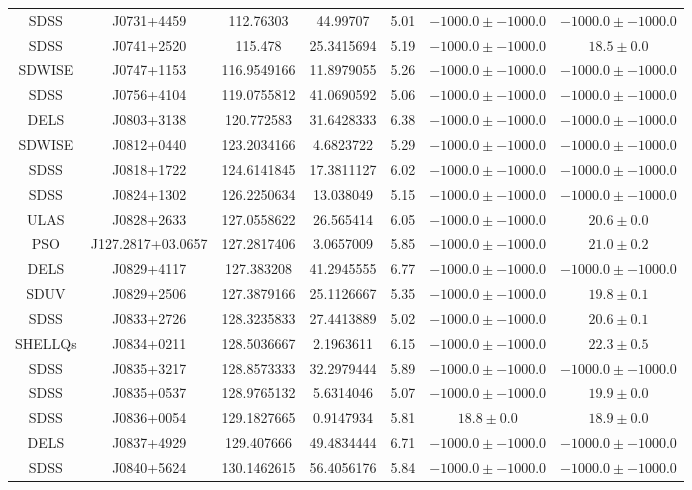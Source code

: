 \begin{table}
\begin{tabular}{ccccccc}
SDSS & J0731+4459 & 112.76303 & 44.99707 & 5.01 & $-1000.0\pm-1000.0$ & $-1000.0\pm-1000.0$ \\
SDSS & J0741+2520 & 115.478 & 25.3415694 & 5.19 & $-1000.0\pm-1000.0$ & $  18.5\pm  0.0$ \\
SDWISE & J0747+1153 & 116.9549166 & 11.8979055 & 5.26 & $-1000.0\pm-1000.0$ & $-1000.0\pm-1000.0$ \\
SDSS & J0756+4104 & 119.0755812 & 41.0690592 & 5.06 & $-1000.0\pm-1000.0$ & $-1000.0\pm-1000.0$ \\
DELS & J0803+3138 & 120.772583 & 31.6428333 & 6.38 & $-1000.0\pm-1000.0$ & $-1000.0\pm-1000.0$ \\
SDWISE & J0812+0440 & 123.2034166 & 4.6823722 & 5.29 & $-1000.0\pm-1000.0$ & $-1000.0\pm-1000.0$ \\
SDSS & J0818+1722 & 124.6141845 & 17.3811127 & 6.02 & $-1000.0\pm-1000.0$ & $-1000.0\pm-1000.0$ \\
SDSS & J0824+1302 & 126.2250634 & 13.038049 & 5.15 & $-1000.0\pm-1000.0$ & $-1000.0\pm-1000.0$ \\
ULAS & J0828+2633 & 127.0558622 & 26.565414 & 6.05 & $-1000.0\pm-1000.0$ & $  20.6\pm  0.0$ \\
PSO & J127.2817+03.0657 & 127.2817406 & 3.0657009 & 5.85 & $-1000.0\pm-1000.0$ & $  21.0\pm  0.2$ \\
DELS & J0829+4117 & 127.383208 & 41.2945555 & 6.77 & $-1000.0\pm-1000.0$ & $-1000.0\pm-1000.0$ \\
SDUV & J0829+2506 & 127.3879166 & 25.1126667 & 5.35 & $-1000.0\pm-1000.0$ & $  19.8\pm  0.1$ \\
SDSS & J0833+2726 & 128.3235833 & 27.4413889 & 5.02 & $-1000.0\pm-1000.0$ & $  20.6\pm  0.1$ \\
SHELLQs & J0834+0211 & 128.5036667 & 2.1963611 & 6.15 & $-1000.0\pm-1000.0$ & $  22.3\pm  0.5$ \\
SDSS & J0835+3217 & 128.8573333 & 32.2979444 & 5.89 & $-1000.0\pm-1000.0$ & $-1000.0\pm-1000.0$ \\
SDSS & J0835+0537 & 128.9765132 & 5.6314046 & 5.07 & $-1000.0\pm-1000.0$ & $  19.9\pm  0.0$ \\
SDSS & J0836+0054 & 129.1827665 & 0.9147934 & 5.81 & $  18.8\pm  0.0$ & $  18.9\pm  0.0$ \\
DELS & J0837+4929 & 129.407666 & 49.4834444 & 6.71 & $-1000.0\pm-1000.0$ & $-1000.0\pm-1000.0$ \\
SDSS & J0840+5624 & 130.1462615 & 56.4056176 & 5.84 & $-1000.0\pm-1000.0$ & $-1000.0\pm-1000.0$ \\

\end{tabular}
\end{table}
